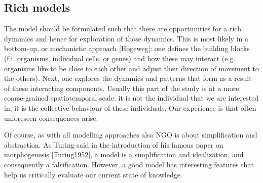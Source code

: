 \subsection{Rich models}

The model should be formulated such that there are opportunities for a rich dynamics and hence for exploration of those dynamics. This is most likely in a bottom-up, or mechanistic approach [Hogeweg]: one defines the building blocks (f.i. organisms, individual cells, or genes) and how these may interact (e.g. organisms like to be close to each other and adjust their direction of movement to the others). Next, one explores the dynamics and patterns that form as a result of these interacting components. Usually this part of the study is at a more coarse-grained spatiotemporal scale: it is not the individual that we are interested in, it is the collective behaviour of these individuals. Our experience is that often unforeseen consequences arise. 

Of course, as with all modelling approaches also NGO is about simplification and abstraction. As Turing said in the introduction of his famous paper on morphogenesis [Turing1952], a model is a simplification and idealization, and consequently a falsification. However, a good model has interesting features that help us critically evaluate our current state of knowledge.